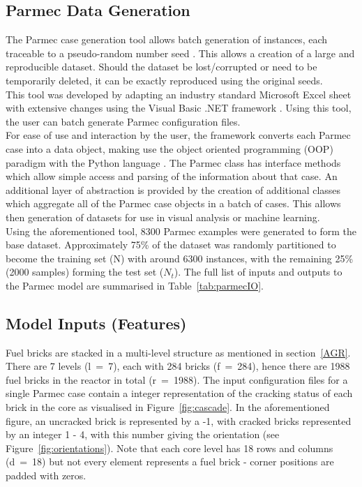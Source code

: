 \subsection{Parmec Data Generation}

The Parmec case generation tool allows batch generation of instances, each traceable to a pseudo-random number seed \cite{blum1982simple}. This allows a creation of a large and reproducible dataset. Should the dataset be lost/corrupted or need to be temporarily deleted, it can be exactly reproduced using the original seeds.
\\

\noindent
This tool was developed by adapting an industry standard Microsoft Excel sheet with extensive changes using the Visual Basic .NET framework \cite{grundgeiger2018programming}. Using this tool, the user can batch generate Parmec configuration files. 
\\

\noindent
For ease of use and interaction by the user, the framework converts each Parmec case into a data object, making use the object oriented programming (OOP) paradigm \cite{meyer1997object} with the Python language \cite{deitel2002python}. The Parmec class has interface methods which allow simple access and parsing of the information about that case. An additional layer of abstraction is provided by the creation of additional classes which aggregate all of the Parmec case objects in a batch of cases. This allows then generation of datasets for use in visual analysis or machine learning.
\\

\noindent
Using the aforementioned tool, 8300 Parmec examples were generated to form the base dataset. Approximately 75\% of the dataset was randomly partitioned to become the training set (N) with around 6300 instances, with the remaining 25\% (2000 samples) forming the test set ($N_t$). The full list of inputs and outputs to the Parmec model are summarised in Table~\ref{tab:parmecIO}.


\subsection{Model Inputs (Features)} \label{data:inputs}

Fuel bricks are stacked in a multi-level structure as mentioned in section~\ref{AGR}. There are 7 levels (l~=~7), each with 284 bricks (f~=~284), hence there are 1988 fuel bricks in the reactor in total (r~=~1988). The input configuration files for a single Parmec case contain a integer representation of the cracking status of each brick in the core as visualised in Figure~\ref{fig:cascade}. In the aforementioned figure, an uncracked brick is represented by a -1, with cracked bricks represented by an integer 1 - 4, with this number giving the orientation (see Figure~\ref{fig:orientations}). Note that each core level has 18 rows and columns (d~=~18) but not every element represents a fuel brick - corner positions are padded with zeros.
\\

